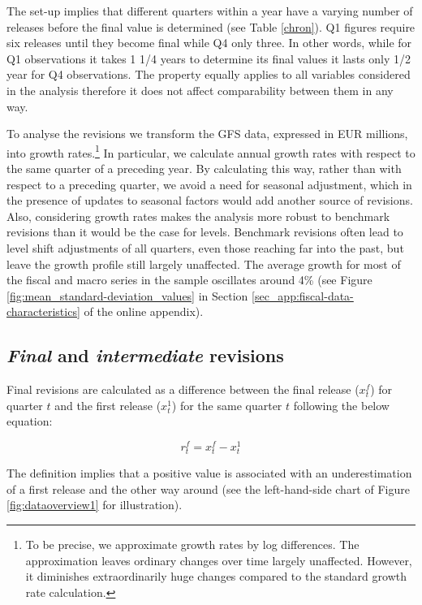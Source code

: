 The set-up implies that different quarters within a year have a varying
number of releases before the final value is determined (see Table \ref{chron}).
Q1 figures require six releases until they become final while Q4 only
three. In other words, while for Q1 observations it takes 1 1/4 years
to determine its final values it lasts only 1/2 year for Q4 observations.
The property equally applies to all variables considered in the analysis
therefore it does not affect comparability between them in any way.

To analyse the revisions we transform the GFS data, expressed in
EUR millions, into growth rates.\footnote{To be precise, we approximate growth rates 
by log differences. The approximation leaves ordinary changes over time largely unaffected. 
However, it diminishes extraordinarily huge changes compared to the standard growth rate calculation.}
In particular, we calculate annual growth rates with respect to the
same quarter of a preceding year. By calculating this way, rather
than with respect to a preceding quarter, we avoid a need for seasonal
adjustment, which in the presence of updates to seasonal factors would
add another source of revisions. Also, considering growth rates makes
the analysis more robust to benchmark revisions than it would be the case for levels. Benchmark revisions often lead to level shift adjustments of all quarters, even those reaching far into the past, but leave the growth profile still largely unaffected. The average growth for most of the fiscal and macro series in the sample oscillates around 4\% (see Figure \ref{fig:mean_standard-deviation_values} 
in Section \ref{sec_app:fiscal-data-characteristics} of the online appendix).

\subsection{\emph{Final} and \emph{intermediate} revisions\label{subsec:final_intermediate_revisions}}

Final revisions are calculated as a difference between the final release
($x_{t}^{f}$) for quarter $t$ and the first release ($x_{t}^{1}$) for the same quarter $t$ following the
below equation:

\[
r_{t}^{f}=x_{t}^{f}-x_{t}^{1}
\]

The definition implies that a positive value is
associated with an underestimation of a first release and the other
way around (see the left-hand-side chart of Figure \ref{fig:dataoverview1}
for illustration).

